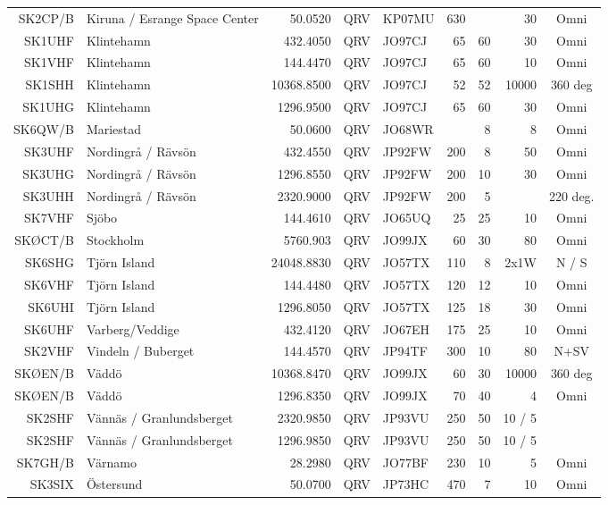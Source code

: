 \begin{landscape}
\begin{tabular}{rlrllrrrc}
SK2CP/B	& Kiruna / Esrange Space Center	& 50.0520    & QRV	& KP07MU & 630 &     & 30     &	Omni     \\
SK1UHF	& Klintehamn                    & 432.4050   & QRV	& JO97CJ & 65  & 60  & 30     &	Omni     \\
SK1VHF	& Klintehamn                    & 144.4470   & QRV	& JO97CJ & 65  & 60  & 10     &	Omni     \\
SK1SHH	& Klintehamn                    & 10368.8500 & QRV	& JO97CJ & 52  & 52  & 10000  &	360 deg  \\
SK1UHG	& Klintehamn                    & 1296.9500  & QRV	& JO97CJ & 65  & 60  & 30     &	Omni     \\
SK6QW/B	& Mariestad                     & 50.0600    & QRV	& JO68WR &     & 8   & 8      &	Omni     \\
SK3UHF	& Nordingrå / Rävsön            & 432.4550   & QRV	& JP92FW & 200 & 8   & 50     &	Omni     \\
SK3UHG	& Nordingrå / Rävsön            & 1296.8550  & QRV	& JP92FW & 200 & 10  & 30     &	Omni     \\
SK3UHH	& Nordingrå / Rävsön            & 2320.9000  & QRV	& JP92FW & 200 & 5   &        &	220 deg. \\
SK7VHF	& Sjöbo                         & 144.4610   & QRV	& JO65UQ & 25  & 25  & 10     &	Omni     \\
SKØCT/B	& Stockholm                     & 5760.903   & QRV	& JO99JX & 60  & 30  & 80     &	Omni     \\
SK6SHG	& Tjörn Island                  & 24048.8830 & QRV	& JO57TX & 110 & 8   & 2x1W   &	N / S    \\
SK6VHF	& Tjörn Island                  & 144.4480   & QRV	& JO57TX & 120 & 12  & 10     &	Omni     \\
SK6UHI	& Tjörn Island                  & 1296.8050  & QRV	& JO57TX & 125 & 18  & 30     &	Omni     \\
SK6UHF	& Varberg/Veddige               & 432.4120   & QRV	& JO67EH & 175 & 25  & 10     &	Omni     \\
SK2VHF	& Vindeln / Buberget            & 144.4570   & QRV	& JP94TF & 300 & 10  & 80     &	N+SV     \\
SKØEN/B	& Väddö                         & 10368.8470 & QRV	& JO99JX & 60  & 30  & 10000  &	360 deg  \\
SKØEN/B	& Väddö                         & 1296.8350  & QRV	& JO99JX & 70  & 40  & 4      &	Omni     \\
SK2SHF	& Vännäs / Granlundsberget	& 2320.9850  & QRV	& JP93VU & 250 & 50  & 10 / 5 &          \\
SK2SHF	& Vännäs / Granlundsberget	& 1296.9850  & QRV	& JP93VU & 250 & 50  & 10 / 5 &          \\
SK7GH/B	& Värnamo                       & 28.2980    & QRV	& JO77BF & 230 & 10  & 5      &	Omni     \\
SK3SIX	& Östersund                     & 50.0700    & QRV	& JP73HC & 470 & 7   & 10     &	Omni     \\
\end{tabular}
\clearpage


\end{landscape}
